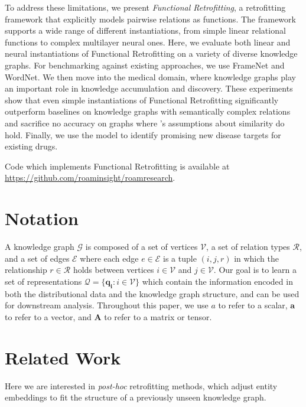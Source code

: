 \documentclass[11pt, a4paper]{article}
\begin{document}
To address these limitations, we present \emph{Functional Retrofitting}, a retrofitting framework that explicitly models pairwise relations as functions. The framework supports a wide range of different instantiations, from simple linear relational functions to complex multilayer neural ones. Here, we evaluate both linear and neural instantiations of Functional Retrofitting on a variety of diverse knowledge graphs. For benchmarking against existing approaches, we use FrameNet and WordNet. We then move into the medical domain, where knowledge graphs play an important role in knowledge accumulation and discovery. %
These experiments show that even simple instantiations of Functional Retrofitting significantly outperform baselines on knowledge graphs with semantically complex relations and sacrifice no accuracy on graphs where 's assumptions about similarity do hold. Finally, we use the model to identify promising new disease targets for existing drugs.

Code which implements Functional Retrofitting is available at \url{https://github.com/roaminsight/roamresearch}.

\section{Notation}
A knowledge graph $\mathcal{G}$ is composed of a set of vertices $\mathcal{V}$, a set of relation types $\mathcal{R}$, and a set of edges $\mathcal{E}$ where each edge $e\in \mathcal{E}$ is a tuple $(i,j,r)$ in which the relationship $r\in \mathcal{R}$ holds between vertices $i\in \mathcal{V}$ and $j\in \mathcal{V}$. Our goal is to learn a set of representations $\mathcal{Q} = \{\boldsymbol{q_i} : i \in \mathcal{V}\}$ which contain the information encoded in both the distributional data and the knowledge graph structure, and can be used for downstream analysis. Throughout this paper, we use $a$ to refer to a scalar, $\boldsymbol{a}$ to refer to a vector, and $\boldsymbol{A}$ to refer to a matrix or tensor.

\section{Related Work}
\label{sec:related_work}
Here we are interested in \textit{post-hoc} retrofitting methods, which adjust entity embeddings to fit the structure of a previously unseen knowledge graph.
\end{document}
